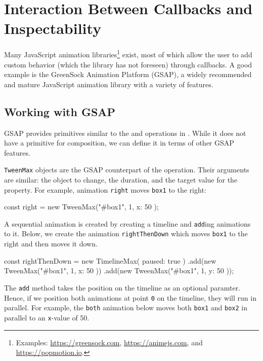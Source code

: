 \section{Interaction Between Callbacks and Inspectability}
\label{sec:evaluation}

Many JavaScript animation libraries\footnote{Examples:
\url{https://greensock.com}, \url{https://animejs.com}, and
\url{https://popmotion.io}.} exist, most of which allow the user to add custom
behavior (which the library has not foreseen) through callbacks. A good example
is the GreenSock Animation Platform (GSAP), a widely recommended and mature
JavaScript animation library with a variety of features.

\subsection{Working with GSAP}

GSAP provides primitives similar to the  and
 operations in \dsl{}. While it does not have a primitive for
 composition, we can define it in terms of other GSAP features.

\texttt{TweenMax} objects are the GSAP counterpart of the
 operation. Their arguments are similar: the object to change, the
duration, and the target value for the
property. For example, animation \texttt{right} moves
\texttt{box1} to the right:

\begin{js}
const right = new TweenMax("#box1", 1, { x: 50 });
\end{js}

A sequential animation is created by creating a timeline and \texttt{add}ing
animations to it.  Below, we create the animation \texttt{rightThenDown} which
moves \texttt{box1} to the right and then moves it down.

\begin{js}
const rightThenDown = new TimelineMax({ paused: true })
  .add(new TweenMax("#box1", 1, { x: 50 }))
  .add(new TweenMax("#box1", 1, { y: 50 }));
\end{js}


The \texttt{add} method takes the position on the timeline as an optional
paramter. Hence, if we position both animations at point \texttt{0} on the timeline,
they will run in parallel. For example, the \texttt{both} animation below 
moves both \texttt{box1} and \texttt{box2} in parallel to an \texttt{x}-value
of 50.

